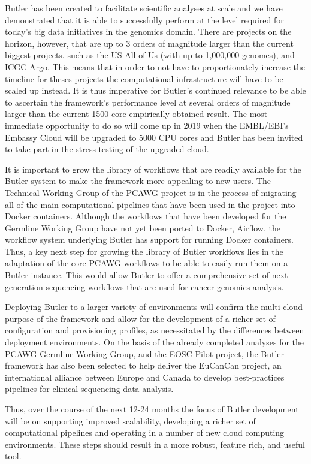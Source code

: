 Butler has been created to facilitate scientific analyses at scale and we have demonstrated that it is able to successfully perform at the level required for today's big data initiatives in the genomics domain. There are projects on the horizon, however, that are up to 3 orders of magnitude larger than the current biggest projects. such as the US All of Us\autocite{collins2015new} (with up to 1,000,000 genomes), and ICGC Argo. This means that in order to not have to proportionately increase the timeline for theses projects the computational infrastructure will have to be scaled up instead. It is thus imperative for Butler's continued relevance to be able to ascertain the framework's performance level at several orders of magnitude larger than the current 1500 core empirically obtained result. The most immediate opportunity to do so will come up in 2019 when the EMBL/EBI's Embassy Cloud will be upgraded to 5000 CPU cores and Butler has been invited to take part in the stress-testing of the upgraded cloud. 

It is important to grow the library of workflows that are readily available for the Butler system to make the framework more appealing to new users. The Technical Working Group of the PCAWG project is in the process of migrating all of the main computational pipelines that have been used in the project into Docker\autocite{merkel2014docker} containers. Although the workflows that have been developed for the Germline Working Group have not yet been ported to Docker, Airflow, the workflow system underlying Butler has support for running Docker containers. Thus, a key next step for growing the library of Butler workflows lies in the adaptation of the core PCAWG workflows to be able to easily run them on a Butler instance. This would allow Butler to offer a comprehensive set of next generation sequencing workflows that are used for cancer genomics analysis.

Deploying Butler to a larger variety of environments will confirm the multi-cloud purpose of the framework and allow for the development of a richer set of configuration and provisioning profiles, as necessitated by the differences between deployment environments. On the basis of the already completed analyses for the PCAWG Germline Working Group, and the EOSC Pilot project, the Butler framework has also been selected to help deliver the EuCanCan project, an international alliance between Europe and Canada to develop best-practices pipelines for clinical sequencing data analysis.

Thus, over the course of the next 12-24 months the focus of Butler development will be on supporting improved scalability, developing a richer set of computational pipelines and operating in a number of new cloud computing environments. These steps should result in a more robust, feature rich, and useful tool.


